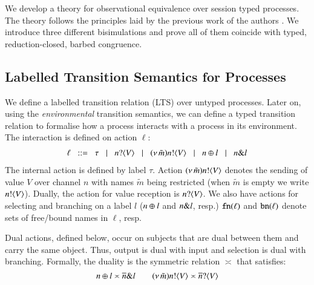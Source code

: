 \noi We develop a theory for observational equivalence over
session typed \HOp processes. The theory follows the principles
laid by the previous work of the authors
\cite{DBLP:conf/forte/KouzapasYH11,KY13,dkphdthesis}.
We introduce three different bisimulations and prove 
all of them coincide with typed, reduction-closed,
barbed congruence. 

\subsection{Labelled Transition Semantics for Processes}\label{ss:lts}
\noi We define a labelled transition relation (LTS) over
untyped processes. 
Later on, using the \emph{environmental} transition semantics, 
we can define a typed transition relation to formalise 
how a process interacts with a process in its environment. The interaction
is defined on action $\ell$:
\[
\begin{array}{l}
		\ell	\;\;::=\;\;   \tau 
		\;\;\;|\;\;\;n ? \langle V \rangle 
			\;\;\;|\;\;\; (\nu\, \tilde{m}) n ! \langle V \rangle
			\;\;\;|\;\;\;  n \oplus l 
			\;\;\;|\;\;\; n \& l 
\end{array}
\]
\noi The internal action is defined by label $\tau$.
Action $(\nu\, \tilde{m}) n ! \langle V \rangle$ denotes the sending of value $V$ over channel $n$ with
names $\tilde{m}$ being restricted
(when $\tilde{m}$ is empty we write $n ! \langle V \rangle$).
Dually, the action for value reception is 
$n ? \langle V \rangle$.
We also have actions for selecting 
and branching on
a label $l$ ($n \oplus l$ and $n \& l$, resp.)
$\mathtt{fn}(\ell)$ and $\mathtt{bn}(\ell)$ denote 
 sets of free/bound names in $\ell$, resp.

Dual actions, defined below, occur on subjects that are dual between them and carry the same
object. Thus, output is dual with input and 
selection is dual with branching.
Formally, the duality is the symmetric relation $\asymp$ that satisfies:
\[
	n \oplus l \asymp \overline{n} \& l
	\qquad
	(\nu\, \tilde{m}) n ! \langle V \rangle \asymp \overline{n} ? \langle V \rangle
\]

\smallskip

